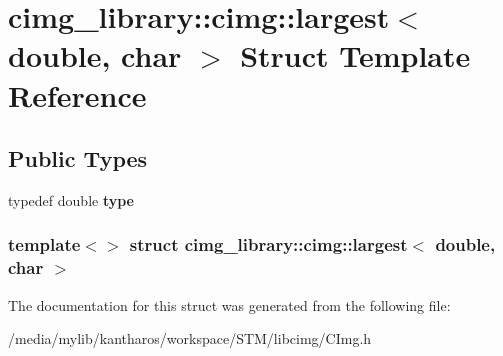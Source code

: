 \hypertarget{structcimg__library_1_1cimg_1_1largest_3_01double_00_01char_01_4}{
\section{cimg\_\-library::cimg::largest$<$ double, char $>$ Struct Template Reference}
\label{structcimg__library_1_1cimg_1_1largest_3_01double_00_01char_01_4}
}
\subsection*{Public Types}
\begin{DoxyCompactItemize}
\item 
\hypertarget{structcimg__library_1_1cimg_1_1largest_3_01double_00_01char_01_4_aec90b6408ec06c19f06f936f394b7d27}{
typedef double {\bfseries type}}
\label{structcimg__library_1_1cimg_1_1largest_3_01double_00_01char_01_4_aec90b6408ec06c19f06f936f394b7d27}

\end{DoxyCompactItemize}
\subsubsection*{template$<$$>$ struct cimg\_\-library::cimg::largest$<$ double, char $>$}



The documentation for this struct was generated from the following file:\begin{DoxyCompactItemize}
\item 
/media/mylib/kantharos/workspace/STM/libcimg/CImg.h\end{DoxyCompactItemize}
